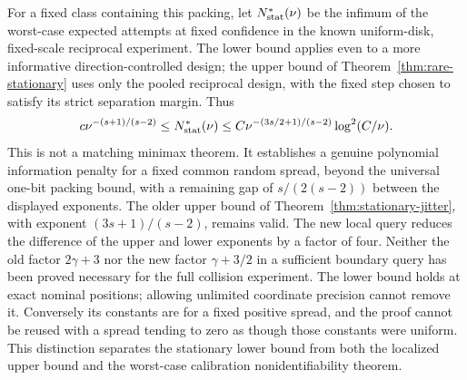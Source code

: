 For a fixed class containing this packing, let $N^*_{\rm stat}(\nu)$
be the infimum of the worst-case expected attempts at fixed confidence
in the known uniform-disk, fixed-scale reciprocal experiment. The lower
bound applies even to a more informative direction-controlled design;
the upper bound of Theorem~\ref{thm:rare-stationary} uses only the pooled
reciprocal design, with the fixed step chosen to satisfy its strict
separation margin. Thus
\begin{equation}\label{eq:stationary-bracket}
 c\nu^{-(s+1)/(s-2)}
       \le N^*_{\rm stat}(\nu)
       \le C\nu^{-(3s/2+1)/(s-2)}\log^2(C/\nu).
\end{equation}
This is not a matching minimax theorem. It establishes a genuine
polynomial information penalty for a fixed common random spread,
beyond the universal one-bit packing bound, with a remaining gap of
$s/(2(s-2))$ between the displayed exponents. The older upper bound
of Theorem~\ref{thm:stationary-jitter}, with exponent $(3s+1)/(s-2)$,
remains valid. The new local query reduces the difference of the
upper and lower exponents by a factor of four. Neither the old factor
$2\gamma+3$ nor the new factor $\gamma+3/2$ in a sufficient boundary
query has been proved necessary for the full collision experiment. The lower
bound holds at exact nominal positions; allowing unlimited coordinate
precision cannot remove it. Conversely its constants are for a fixed
positive spread, and the proof cannot be reused with a spread tending
to zero as though those constants were uniform. This distinction
separates the stationary lower bound from both the localized upper
bound and the worst-case calibration nonidentifiability theorem.
